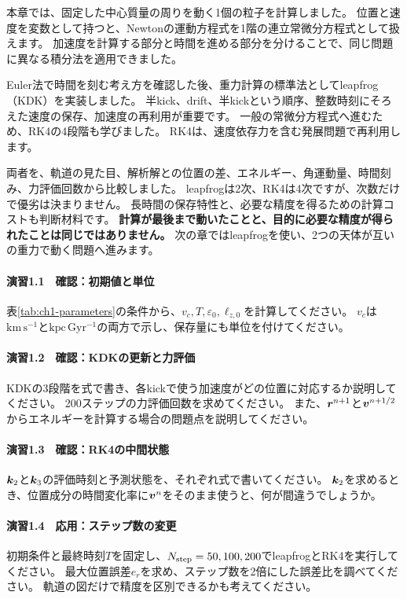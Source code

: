 本章では、固定した中心質量の周りを動く1個の粒子を計算しました。
位置と速度を変数として持つと、Newtonの運動方程式を1階の連立常微分方程式として扱えます。
加速度を計算する部分と時間を進める部分を分けることで、同じ問題に異なる積分法を適用できました。

Euler法で時間を刻む考え方を確認した後、重力計算の標準法としてleapfrog（KDK）を実装しました。
半kick、drift、半kickという順序、整数時刻にそろえた速度の保存、加速度の再利用が重要です。
一般の常微分方程式へ進むため、RK4の4段階も学びました。
RK4は、速度依存力を含む発展問題で再利用します。

両者を、軌道の見た目、解析解との位置の差、エネルギー、角運動量、時間刻み、力評価回数から比較しました。
leapfrogは2次、RK4は4次ですが、次数だけで優劣は決まりません。
長時間の保存特性と、必要な精度を得るための計算コストも判断材料です。
\textbf{計算が最後まで動いたことと、目的に必要な精度が得られたことは同じではありません。}
次の章ではleapfrogを使い、2つの天体が互いの重力で動く問題へ進みます。

\chapterexercises
\paragraph{演習1.1　確認：初期値と単位}
表\ref{tab:ch1-parameters}の条件から、$v_c,T,\varepsilon_0,\ell_{z,0}$を計算してください。
$v_c$は$\mathrm{km\,s^{-1}}$と$\mathrm{kpc\,Gyr^{-1}}$の両方で示し、保存量にも単位を付けてください。

\paragraph{演習1.2　確認：KDKの更新と力評価}
KDKの3段階を式で書き、各kickで使う加速度がどの位置に対応するか説明してください。
200ステップの力評価回数を求めてください。
また、$\boldsymbol r^{n+1}$と$\boldsymbol v^{n+1/2}$からエネルギーを計算する場合の問題点を説明してください。

\paragraph{演習1.3　確認：RK4の中間状態}
$\boldsymbol k_2$と$\boldsymbol k_3$の評価時刻と予測状態を、それぞれ式で書いてください。
$\boldsymbol k_2$を求めるとき、位置成分の時間変化率に$\boldsymbol v^n$をそのまま使うと、何が間違うでしょうか。

\paragraph{演習1.4　応用：ステップ数の変更}
初期条件と最終時刻$T$を固定し、$N_{\rm step}=50,100,200$でleapfrogとRK4を実行してください。
最大位置誤差$e_r$を求め、ステップ数を2倍にした誤差比を調べてください。
軌道の図だけで精度を区別できるかも考えてください。

